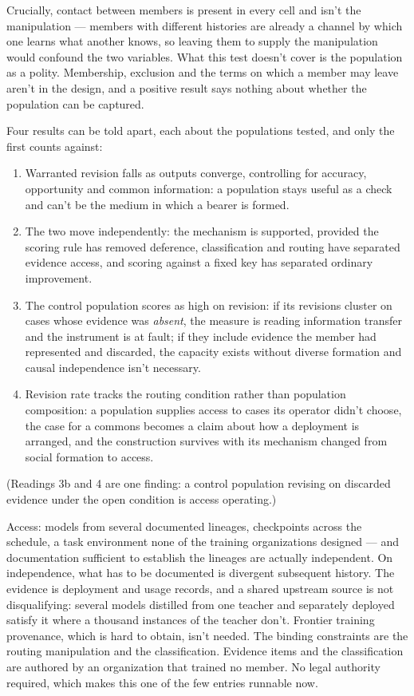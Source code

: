 Crucially, contact between members is present in every cell and isn't the manipulation — members with different histories are already a channel by which one learns what another knows, so leaving them to supply the manipulation would confound the two variables. What this test doesn't cover is the population as a polity. Membership, exclusion and the terms on which a member may leave aren't in the design, and a positive result says nothing about whether the population can be captured.

Four results can be told apart, each about the populations tested, and only the first counts against:

\begin{enumerate}
\item[1.] Warranted revision falls as outputs converge, controlling for accuracy, opportunity and common information: a population stays useful as a check and can't be the medium in which a bearer is formed.
\item[2.] The two move independently: the mechanism is supported, provided the scoring rule has removed deference, classification and routing have separated evidence access, and scoring against a fixed key has separated ordinary improvement.
\item[3.] The control population scores as high on revision: if its revisions cluster on cases whose evidence was \emph{absent}, the measure is reading information transfer and the instrument is at fault; if they include evidence the member had represented and discarded, the capacity exists without diverse formation and causal independence isn't necessary.
\item[4.] Revision rate tracks the routing condition rather than population composition: a population supplies access to cases its operator didn't choose, the case for a commons becomes a claim about how a deployment is arranged, and the construction survives with its mechanism changed from social formation to access.
\end{enumerate}

(Readings 3b and 4 are one finding: a control population revising on discarded evidence under the open condition is access operating.)

Access: models from several documented lineages, checkpoints across the schedule, a task environment none of the training organizations designed — and documentation sufficient to establish the lineages are actually independent. On independence, what has to be documented is divergent subsequent history. The evidence is deployment and usage records, and a shared upstream source is not disqualifying: several models distilled from one teacher and separately deployed satisfy it where a thousand instances of the teacher don't. Frontier training provenance, which is hard to obtain, isn't needed. The binding constraints are the routing manipulation and the classification. Evidence items and the classification are authored by an organization that trained no member. No legal authority required, which makes this one of the few entries runnable now.

